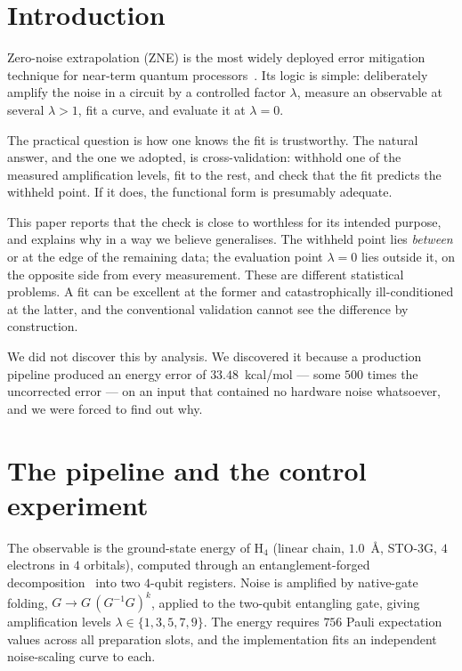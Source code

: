 \documentclass[aps,prx,twocolumn,superscriptaddress,nofootinbib,floatfix]{revtex4-2}
\begin{document}
\section{Introduction}

Zero-noise extrapolation (ZNE) is the most widely deployed error
mitigation technique for near-term quantum
processors~\cite{temme2017,li2017,kandala2019}. Its logic is simple:
deliberately amplify the noise in a circuit by a controlled factor
$\lambda$, measure an observable at several $\lambda>1$, fit a curve, and
evaluate it at $\lambda=0$.

The practical question is how one knows the fit is trustworthy. The
natural answer, and the one we adopted, is cross-validation: withhold one
of the measured amplification levels, fit to the rest, and check that the
fit predicts the withheld point. If it does, the functional form is
presumably adequate.

This paper reports that the check is close to worthless for its intended
purpose, and explains why in a way we believe generalises. The withheld
point lies \emph{between} or at the edge of the remaining data; the
evaluation point $\lambda=0$ lies outside it, on the opposite side from
every measurement. These are different statistical problems. A fit can be
excellent at the former and catastrophically ill-conditioned at the
latter, and the conventional validation cannot see the difference by
construction.

We did not discover this by analysis. We discovered it because a
production pipeline produced an energy error of $33.48$~kcal/mol --- some
$500$ times the uncorrected error --- on an input that contained no
hardware noise whatsoever, and we were forced to find out why.

\section{The pipeline and the control experiment}

The observable is the ground-state energy of H$_4$ (linear chain,
$1.0$~\AA{}, STO-3G, $4$ electrons in $4$ orbitals), computed through an
entanglement-forged decomposition~\cite{eddins2022} into two $4$-qubit
registers. Noise is amplified by native-gate folding, $G \to
G\,(G^{-1}G)^{k}$, applied to the two-qubit entangling gate, giving
amplification levels $\lambda \in \{1,3,5,7,9\}$. The energy requires
$756$ Pauli expectation values across all preparation slots, and the
implementation fits an independent noise-scaling curve to each.
\end{document}
